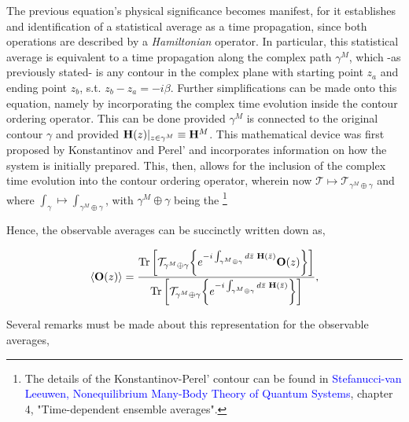 The previous equation's physical significance becomes manifest, for it establishes and identification of a statistical average as a time propagation, since both operations are described by a \emph{Hamiltonian} operator.
In particular, this statistical average is equivalent to a time propagation along the complex path $\gamma^M$, which -as previously stated- is any contour in the complex plane with starting point $z_a$ and ending point $z_b$, s.t. $z_b - z_a = - i \beta$. 
Further simplifications can be made onto this equation, namely by incorporating the complex time evolution inside the contour ordering operator.
This can be done provided $\gamma^M$ is connected to the original contour $\gamma$ and provided ${\bf H}(z)|_{z \in \gamma^M} \equiv {\bf H}^M$.
This mathematical device was first proposed by Konstantinov and Perel' and incorporates information on how the system is initially prepared. 
This, then, allows for the inclusion of the complex time evolution into the contour ordering operator, wherein now $\mathcal{T} \mapsto \mathcal{T}_{\gamma^M \oplus \gamma}$ and where $\int_{\gamma} \mapsto \int_{\gamma^M \oplus \gamma}$, with $\gamma^M \oplus \gamma$ being the  \footnote{
The details of the Konstantinov-Perel' contour can be found in \textcolor{blue}{Stefanucci-van Leeuwen, Nonequilibrium Many-Body Theory of Quantum Systems}, chapter 4, "Time-dependent ensemble averages".}

\begin{mdframed}[style=MyFrame]

Hence, the observable averages can be succinctly written down as,

\begin{equation} \label{NEqQFT_Keldysh_obsavg_KonstantinovPerel'}
    \langle {\bf O}(z) \rangle = \frac{\Tr \bigg[ \mathcal{T}_{\gamma^M \oplus \gamma}  \bigg\{
            e^{-i \int_{\gamma^M \oplus \gamma} d\bar{z} \textnormal{ } {\bf H}(\bar{z})} {\bf O}(z) 
        \bigg\} \bigg]}{\Tr \bigg[ \mathcal{T}_{\gamma^M \oplus \gamma} \bigg\{
            e^{-i \int_{\gamma^M \oplus \gamma} d\bar{z} \textnormal{ } {\bf H}(\bar{z})} 
        \bigg\}  \bigg]},
\end{equation}

\end{mdframed}

Several remarks must be made about this representation for the observable averages,

\begin{remark}
\end{remark}

